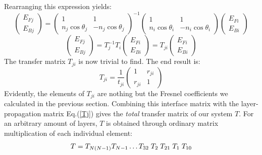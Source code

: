 \documentclass[preprint, onecolumn, amsmath, amssymb, aps]{revtex4-1}
\numberwithin{equation}{section}
\begin{document}
\noindent
Rearranging this expression yields:
\begin{equation}
\begin{pmatrix}
		E_{Fj}  \\
		E_{Bj}
\end{pmatrix} =
\begin{pmatrix}
		1 & 1 \\
		n_{j} \cos \theta_{j} & - n_{j} \cos \theta_{j}
\end{pmatrix}^{-1}
\begin{pmatrix}
	1 & 1 \\
	n_{i} \cos \theta_{i} & - n_{i} \cos \theta_{i}
\end{pmatrix}  
\begin{pmatrix}
		E_{Fi}  \\
		E_{Bi}
\end{pmatrix} \nonumber
\end{equation}
\begin{equation}
\begin{pmatrix}
		E_{Fj}  \\
		E_{Bj}
\end{pmatrix} =
	 T_{j}^{-1} T_{i}
\begin{pmatrix}
		E_{Fi}  \\
		E_{Bi}
\end{pmatrix} = 
    T_{ji}
\begin{pmatrix}
	E_{Fi}  \\
	E_{Bi}
\end{pmatrix}
\end{equation}
\noindent
The transfer matrix $T_{ji}$ is now trivial to find. The end result is:
\begin{equation}\label{Tji}
T_{ji} = \frac{1}{t_{ji}}
\begin{pmatrix}
		1 & r_{ji} \\
		r_{ji} & 1
\end{pmatrix}
\end{equation}
\noindent
Evidently, the elements of $T_{ji}$ are nothing but the Fresnel coefficients we calculated in the previous section. Combining this interface matrix with the layer-propagation matrix Eq.(\ref{Tj}) gives the \textit{total} transfer matrix of our system $T$. For an arbitrary amount of layers, $T$ is obtained through ordinary matrix multiplication of each individual element:
\begin{equation}
T = T_{N(N-1)} T_{N-1} \hdots T_{32} \hspace{1mm} T_{2} \hspace{1mm} T_{21} \hspace{1mm} T_{1} \hspace{1mm} T_{10}
\end{equation}
\end{document}
